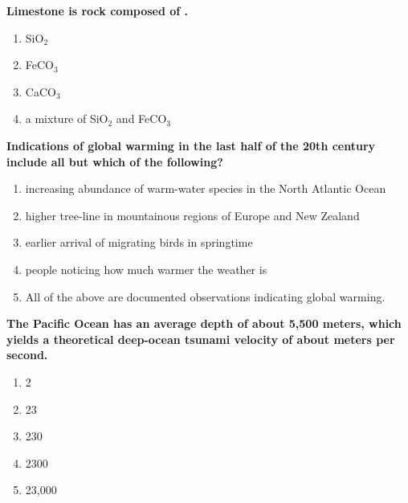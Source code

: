 \item {
\setlength{\itemsep}{0cm}
\setlength{\parskip}{.2cm}
\begin{samepage}
\textbf{
Limestone is rock composed of \makebox[1cm]{\Rivpt\hrulefill\Rivpt}. 
}
\begin{enumerate}
\item {  SiO\ensuremath{_2} }
\item {  FeCO\ensuremath{_3} }
\item {  CaCO\ensuremath{_3} }
\item {  a mixture of SiO\ensuremath{_2} and FeCO\ensuremath{_3} }
\end{enumerate}
\end{samepage}
}
\item {
\setlength{\itemsep}{0cm}
\setlength{\parskip}{.2cm}
\begin{samepage}
\textbf{
Indications of global warming in the last half of the 20th century include all but which of the following?
}
\begin{enumerate}
\item {  increasing abundance of warm-water species in the North Atlantic Ocean }
\item {  higher tree-line in mountainous regions of Europe and New Zealand }
\item {  earlier arrival of migrating birds in springtime }
\item {  people noticing how much warmer the weather is }
\item {  All of the above are documented observations indicating global warming. }
\end{enumerate}
\end{samepage}
}
\item {
\setlength{\itemsep}{0cm}
\setlength{\parskip}{.2cm}
\begin{samepage}
\textbf{
The Pacific Ocean has an average depth of about 5,500 meters, which yields a theoretical deep-ocean tsunami velocity of about \makebox[1cm]{\Rivpt\hrulefill\Rivpt} meters per second.
}
\begin{enumerate}
\item { 	2 }
\item { 	23 }
\item { 	230 }
\item { 	2300 }
\item { 	23,000 		 }
\end{enumerate}
\end{samepage}
}
